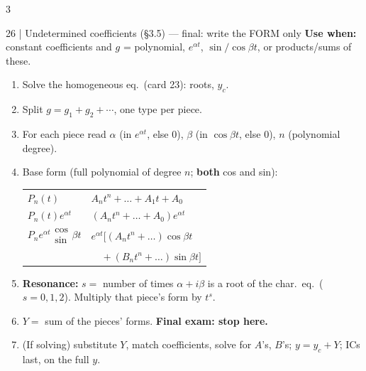 \documentclass[8pt]{extarticle}
\newcommand{\key}[1]{\textcolor{grn}{\textbf{#1}}}
\newcommand{\when}[1]{\textcolor{amb}{\textbf{Use when:}} #1\par}
\begin{document}
\begin{multicols*}{3}
\begin{card}{26 \;|\; Undetermined coefficients (\S3.5) --- \textnormal{final: write the FORM only}}
\when{constant coefficients and $g$ = polynomial, $e^{\alpha t}$, $\sin/\cos\beta t$, or products/sums of these.}
\begin{enumerate}
\item Solve the homogeneous eq.\ (card 23): roots, $y_c$.
\item Split $g=g_1+g_2+\cdots$, one type per piece.
\item For each piece read $\alpha$ (in $e^{\alpha t}$, else $0$), $\beta$ (in $\cos\beta t$, else $0$), $n$ (polynomial degree).
\item Base form (full polynomial of degree $n$; \textbf{both} cos and sin):\\[0.5pt]
\begin{tabular}{@{}l@{\;$\to$\;}l@{}}
$P_n(t)$ & $A_nt^n+\dots+A_1t+A_0$\\
$P_n(t)e^{\alpha t}$ & $(A_nt^n+\dots+A_0)e^{\alpha t}$\\
$P_ne^{\alpha t}\!\!\begin{smallmatrix}\cos\\\sin\end{smallmatrix}\!\beta t$ & $e^{\alpha t}[(A_nt^n{+}\dots)\cos\beta t$\\
 & $\quad+(B_nt^n{+}\dots)\sin\beta t]$
\end{tabular}
\item \key{Resonance:} $s=$ number of times $\alpha+i\beta$ is a root of the char.\ eq.\ ($s=0,1,2$). Multiply that piece's form by $t^s$.
\item $Y=$ sum of the pieces' forms. \textbf{Final exam: stop here.}
\item (If solving) substitute $Y$, match coefficients, solve for $A$'s, $B$'s; $y=y_c+Y$; ICs last, on the full $y$.
\end{enumerate}
\end{card}


\end{multicols*}
\end{document}

